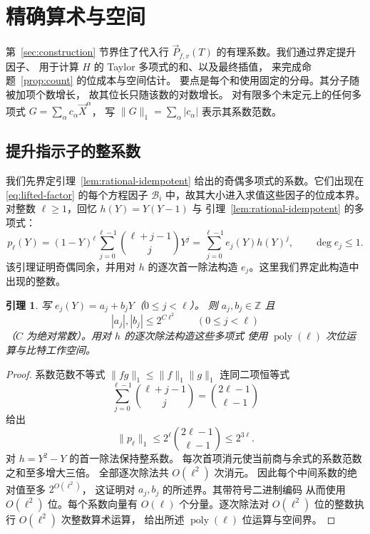 \documentclass[11pt,reqno]{amsart}
\numberwithin{equation}{section}
\newtheorem{lemma}[theorem]{引理}
\theoremstyle{definition}\newtheorem{definition}[theorem]{定义}
\theoremstyle{remark}\newtheorem{remark}[theorem]{注}
\newcommand{\poly}{\operatorname{poly}}
\renewcommand{\le}{\leqslant}
\renewcommand{\ge}{\geqslant}
\begin{document}
\section{精确算术与空间}\label{app:arithmetic}
第~\ref{sec:construction} 节界住了代入行
$\vec{P}_{f,v}(T)$ 的有理系数。我们通过界定提升因子、
用于计算 $H$ 的 Taylor 多项式的和、以及最终插值，
来完成命题~\ref{prop:count} 的位成本与空间估计。
要点是每个和使用固定的分母。其分子随被加项个数增长，
故其位长只随该数的对数增长。
对有限多个未定元上的任何多项式
$G=\sum_\alpha c_\alpha \vec{X}^{\alpha}$，
写 $\|G\|_1=\sum_\alpha|c_\alpha|$
表示其系数范数。

\subsection{提升指示子的整系数}
\label{subsec:rational-lift-height}
我们先界定引理~\ref{lem:rational-idempotent}
给出的奇偶多项式的系数。它们出现在
\eqref{eq:lifted-factor} 的每个方程因子 $\mathcal B_i$
中，故其大小进入求值这些因子的位成本界。
对整数 $\ell\ge1$，回忆 $h(Y)=Y(Y-1)$ 与
引理~\ref{lem:rational-idempotent} 的多项式：
\[
 p_\ell(Y)=(1-Y)^\ell\sum_{j=0}^{\ell-1}
                    \binom{\ell+j-1}{j}Y^j
          =\sum_{j=0}^{\ell-1}e_j(Y)h(Y)^j,
 \qquad \deg e_j\le1.
\]
该引理证明奇偶同余，并用对 $h$ 的逐次首一除法构造
$e_j$。这里我们界定此构造中出现的整数。

\begin{lemma}\label{lem:rational-lift-height}
写 $e_j(Y)=a_j+b_jY$（$0\le j<\ell$）。
则 $a_j,b_j\in\mathbb Z$ 且
\[
 |a_j|,|b_j|\le2^{C\ell^2}\qquad(0\le j<\ell)
\]
（$C$ 为绝对常数）。用对 $h$ 的逐次除法构造这些多项式
使用 $\poly(\ell)$ 次位运算与比特工作空间。
\end{lemma}
\begin{proof}
系数范数不等式 $\|fg\|_1\le\|f\|_1\|g\|_1$
连同二项恒等式
\[
 \sum_{j=0}^{\ell-1}\binom{\ell+j-1}{j}
 =\binom{2\ell-1}{\ell-1}
\]
给出
\[
 \|p_\ell\|_1\le2^\ell\binom{2\ell-1}{\ell-1}\le2^{3\ell}.
\]
对 $h=Y^2-Y$ 的首一除法保持整系数。
每次首项消元使当前商与余式的系数范数之和至多增大三倍。
全部逐次除法共 $O(\ell^2)$ 次消元。
因此每个中间系数的绝对值至多 $2^{O(\ell^2)}$，
这证明对 $a_j,b_j$ 的所述界。其带符号二进制编码
从而使用 $O(\ell^2)$ 位。每个系数向量有 $O(\ell)$
个分量。逐次除法对 $O(\ell^2)$ 位的整数执行
$O(\ell^2)$ 次整数算术运算，
给出所述 $\poly(\ell)$ 位运算与空间界。
\end{proof}
\end{document}
